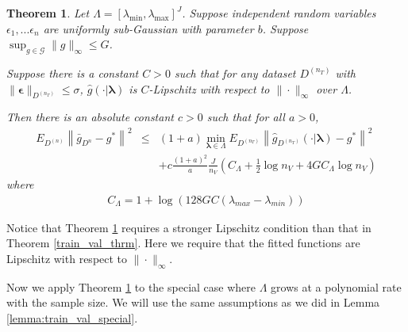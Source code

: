 \documentclass[12pt]{article}
\newtheorem{theorem}{Theorem}
\begin{document}
\begin{theorem}
\label{thrm:kfold}
Let $\Lambda = [\lambda_{\min}, \lambda_{\max}]^J$. 
Suppose independent random variables $\epsilon_1, ... \epsilon_n$ are uniformly sub-Gaussian with parameter $b$. 
Suppose $\sup_{g \in \mathcal{G}} \|g\|_\infty \le G$.

Suppose there is a constant $C>0$ such that for any dataset $D^{(n_T)}$ with $\|\boldsymbol{\epsilon}\|_{D^{(n_T)}} \le \sigma$, $\hat g (\cdot |\boldsymbol{\lambda} )$ is $C$-Lipschitz with respect to $\| \cdot \|_\infty$ over $\Lambda$.

Then there is an absolute constant $c > 0$ such that for all $a > 0$,
\begin{eqnarray}
E_{D^{(n)}} \left \| \bar{g}_{D^{n}} - g^* \right \|^2 &\le&
(1+a) \min_{\boldsymbol{\lambda} \in \Lambda}  E_{D^{(n_T)}} \left \| \hat{g}_{D^{(n_T)}}(\cdot |\boldsymbol \lambda) - g^* \right \|^2 \\
&& +  c \frac{(1+a)^2}{a} \frac{J}{n_V} 
\left (
C_\Lambda + \frac{1}{2} \log n_V +  4G C_\Lambda \log n_V
\right )
\end{eqnarray}
where 
\begin{eqnarray}
C_\Lambda = 1+\log\left(128GC(\lambda_{max}-\lambda_{min})\right)
\end{eqnarray}
\end{theorem}

Notice that Theorem \ref{thrm:kfold} requires a stronger Lipschitz condition than that in Theorem \ref{train_val_thrm}. Here we require that the fitted functions are Lipschitz with respect to $\| \cdot \|_\infty$.

Now we apply Theorem \ref{thrm:kfold} to the special case where $\Lambda$ grows at a polynomial rate with the sample size. We will use the same assumptions as we did in Lemma \ref{lemma:train_val_special}.
\end{document}
